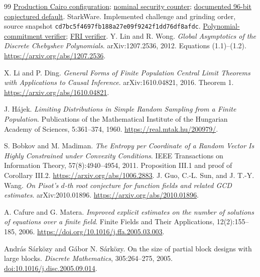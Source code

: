 \documentclass[11pt,letterpaper]{article}
\theoremstyle{definition}
\theoremstyle{remark}
\begin{document}
\begin{thebibliography}{99}
\href{https://github.com/starkware-libs/proving/blob/cd7bc5f4697fb188a27e09f9242f1dd76df8afdc/circuit_registry_definitions/production/cairo_prover_params.json}{Production Cairo configuration};
\href{https://github.com/starkware-libs/proving/blob/cd7bc5f4697fb188a27e09f9242f1dd76df8afdc/crates/stwo/src/core/fri.rs\#L79}{nominal security counter};
\href{https://github.com/starkware-libs/stwo-cairo/blob/2b1fb4ded5496fb2db4e8261cd5ee5ef6b710839/README.md\#L146}{documented 96-bit conjectured default}.
 StarkWare. Implemented challenge and grinding
order, source snapshot
\nolinkurl{cd7bc5f4697fb188a27e09f9242f1dd76df8afdc}.
\href{https://github.com/starkware-libs/proving/blob/cd7bc5f4697fb188a27e09f9242f1dd76df8afdc/crates/stwo/src/core/pcs/verifier.rs\#L62}{Polynomial-commitment verifier};
\href{https://github.com/starkware-libs/proving/blob/cd7bc5f4697fb188a27e09f9242f1dd76df8afdc/crates/stwo/src/core/fri.rs}{FRI verifier}.
 Y. Lin and R. Wong.
\emph{Global Asymptotics of the Discrete Chebyshev Polynomials}.
arXiv:1207.2536, 2012. Equations (1.1)--(1.2).
\url{https://arxiv.org/abs/1207.2536}.

 X. Li and P. Ding.
\emph{General Forms of Finite Population Central Limit Theorems
with Applications to Causal Inference}.
arXiv:1610.04821, 2016. Theorem 1.
\url{https://arxiv.org/abs/1610.04821}.

 J. H\'ajek.
\emph{Limiting Distributions in Simple Random Sampling from a Finite Population}.
Publications of the Mathematical Institute of the Hungarian Academy of Sciences,
5:361--374, 1960.
\url{https://real.mtak.hu/200979/}.

 S. Bobkov and M. Madiman.
\emph{The Entropy per Coordinate of a Random Vector Is Highly
Constrained under Convexity Conditions}.
IEEE Transactions on Information Theory, 57(8):4940--4954, 2011.
Proposition III.1 and proof of Corollary III.2.
\url{https://arxiv.org/abs/1006.2883}.
 J. Guo, C.-L. Sun, and J. T.-Y. Wang.
\emph{On Pisot's $d$-th root conjecture for function fields and related GCD estimates}.
arXiv:2010.01896. \url{https://arxiv.org/abs/2010.01896}.

 A. Cafure and G. Matera.
\emph{Improved explicit estimates on the number of solutions of equations
 over a finite field}.
Finite Fields and Their Applications, 12(2):155--185, 2006.
\url{https://doi.org/10.1016/j.ffa.2005.03.003}.

Andr\'as S\'ark\"ozy and G\'abor N. S\'ark\"ozy.
\newblock On the size of partial block designs with large blocks.
\newblock \emph{Discrete Mathematics}, 305:264--275, 2005.
\newblock \href{https://doi.org/10.1016/j.disc.2005.09.014}{doi:10.1016/j.disc.2005.09.014}.


\end{thebibliography}
\end{document}
